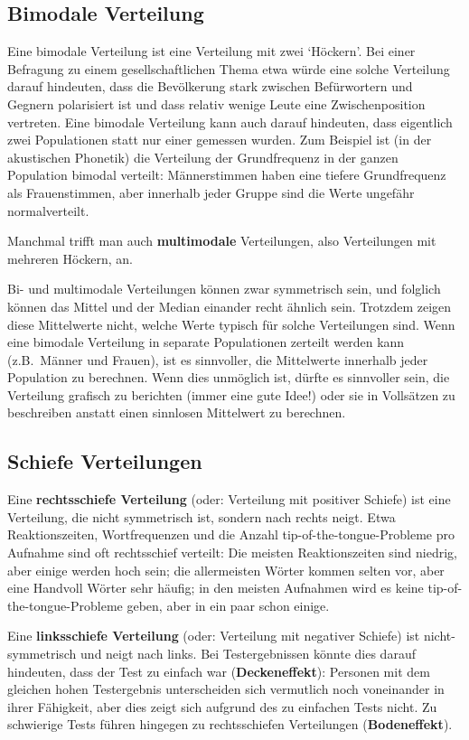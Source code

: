 \documentclass[oneside, 10pt]{book}\usepackage[]{graphicx}\usepackage[]{xcolor}
\begin{document}
\subsection{Bimodale Verteilung}
Eine bimodale Verteilung ist eine Verteilung mit zwei `Höckern'.
Bei einer Befragung zu einem gesellschaftlichen Thema etwa
würde eine solche Verteilung darauf hindeuten,
dass die Bevölkerung stark zwischen Befürwortern und Gegnern polarisiert ist
und dass relativ wenige Leute eine Zwischenposition vertreten.
Eine bimodale Verteilung kann auch darauf hindeuten,
dass eigentlich zwei Populationen statt nur einer gemessen wurden.
Zum Beispiel ist (in der akustischen Phonetik) die Verteilung der Grundfrequenz in der ganzen Population bimodal verteilt: Männerstimmen haben
eine tiefere Grundfrequenz als Frauenstimmen, aber innerhalb jeder Gruppe sind die Werte ungefähr normalverteilt.

Manchmal trifft man auch \textbf{multimodale} Verteilungen,
also Verteilungen mit mehreren Höckern, an.

Bi- und multimodale Verteilungen können zwar symmetrisch sein,
und folglich können das Mittel und der Median einander recht ähnlich
sein. Trotzdem zeigen diese Mittelwerte nicht, welche Werte typisch
für solche Verteilungen sind. Wenn eine bimodale Verteilung in separate
Populationen zerteilt werden kann (z.B.\ Männer und Frauen), ist es
sinnvoller, die Mittelwerte innerhalb jeder Population zu berechnen.
Wenn dies unmöglich ist, dürfte es sinnvoller sein, die Verteilung grafisch
zu berichten (immer eine gute Idee!) oder sie in Vollsätzen
zu beschreiben anstatt einen sinnlosen Mittelwert zu berechnen.

\subsection{Schiefe Verteilungen}
Eine \textbf{rechtsschiefe Verteilung} (oder: Verteilung mit positiver Schiefe)
ist eine Verteilung, die nicht symmetrisch ist, sondern nach rechts neigt.
Etwa Reaktionszeiten, Wortfrequenzen und die Anzahl tip-of-the-tongue-Probleme pro Aufnahme sind oft rechtsschief verteilt: Die meisten Reaktionszeiten sind niedrig,
aber einige werden hoch sein; die allermeisten Wörter kommen selten vor, aber eine
Handvoll Wörter sehr häufig; in den meisten Aufnahmen wird es keine tip-of-the-tongue-Probleme geben, aber in ein paar schon einige.

Eine \textbf{linksschiefe Verteilung} (oder: Verteilung mit negativer Schiefe) ist nicht-sym\-me\-trisch und neigt nach links.
Bei Testergebnissen könnte dies darauf hindeuten, dass der Test zu einfach war (\textbf{Deckeneffekt}): Personen mit dem gleichen hohen Testergebnis unterscheiden sich vermutlich noch voneinander in ihrer Fähigkeit, aber dies zeigt sich aufgrund des zu einfachen Tests nicht.
Zu schwierige Tests führen hingegen zu rechtsschiefen Verteilungen (\textbf{Bodeneffekt}).
\end{document}

